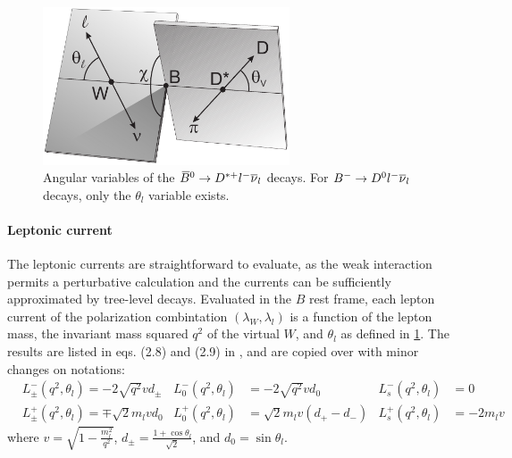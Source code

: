 \begin{figure}[!htb]
    \centering
    \includegraphics[width=0.65\textwidth]{./figs-theory/b_d_angular_vars.pdf}
    \caption{
        Angular variables of the ${{\kern 0.18em\overline{\kern -0.18em B}}{}^0} \rightarrow D^{*+} {l^-}{{\overline{\nu}}_l}$ decays.
        For ${{{B}^-}} \rightarrow {\ensuremath{{D}^0}}{\ensuremath{l^-}}{\ensuremath{{\overline{\nu}}_l}}$ decays,
        only the $\theta_l$ variable exists.
    }
    \label{fig:b-d-decay-schematic}
\end{figure}

\paragraph{Leptonic current}
The leptonic currents are straightforward to evaluate,
as the weak interaction permits a perturbative calculation and the currents can
be sufficiently approximated by tree-level decays.
Evaluated in the $B$ rest frame, each lepton current of the polarization combintation
$(\lambda_W, \lambda_l)$ is a function of the lepton mass,
the invariant mass squared $q^2$ of the virtual $W$,
and $\theta_l$ as defined in \cref{fig:b-d-decay-schematic}.
The results are listed in eqs. (2.8) and (2.9) in
\cite{HAGIWARA1989569}, and are copied over with minor changes on notations:
\begin{align}
    & L^-_\pm(q^2, \theta_l) = -2 \sqrt{q^2} v d_\pm
    & L^-_0(q^2, \theta_l) &= -2 \sqrt{q^2} v d_0
    & L^-_s(q^2, \theta_l) &= 0
    \label{eqn:b-d-l-current-1} \\
    & L^+_\pm(q^2, \theta_l) = \mp \sqrt{2} m_l v d_0
    & L^+_0(q^2, \theta_l) &= \sqrt{2} m_l v(d_+ - d_-)
    & L^+_s(q^2, \theta_l) &= -2 m_l v
    \label{eqn:b-d-l-current-2}
\end{align}
where $v = \sqrt{1 - \frac{m^2_l}{q^2}}$,
$d_\pm = \frac{1 + \cos\theta_l}{\sqrt{2}}$, and $d_0 = \sin\theta_l$.

